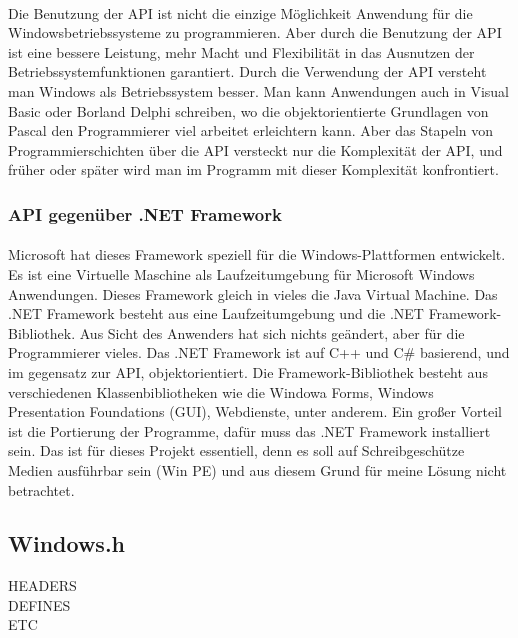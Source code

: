 \paragraph{}
Die Benutzung der API ist nicht die einzige Möglichkeit Anwendung für die Windowsbetriebssysteme zu programmieren. Aber durch die Benutzung der API ist eine bessere Leistung, mehr Macht und Flexibilität in das Ausnutzen der Betriebssystemfunktionen garantiert. Durch die Verwendung der API versteht man Windows als Betriebssystem besser. Man kann Anwendungen auch in Visual Basic oder Borland Delphi schreiben, wo die objektorientierte Grundlagen von Pascal den Programmierer viel arbeitet erleichtern kann. Aber das Stapeln von Programmierschichten über die API versteckt nur die Komplexität der API, und früher oder später wird man im Programm mit dieser Komplexität konfrontiert.

\subsubsection{API gegenüber .NET Framework}
\paragraph{}
Microsoft hat dieses Framework speziell für die Windows-Plattformen entwickelt. Es ist eine Virtuelle Maschine als Laufzeitumgebung für Microsoft Windows Anwendungen. Dieses Framework gleich in vieles die Java Virtual Machine. Das .NET Framework besteht aus eine Laufzeitumgebung und die .NET Framework-Bibliothek. Aus Sicht des Anwenders hat sich nichts geändert, aber für die Programmierer vieles. Das .NET Framework ist auf C++ und C\# basierend, und im gegensatz zur API, objektorientiert. Die Framework-Bibliothek besteht aus verschiedenen Klassenbibliotheken wie die Windowa Forms, Windows Presentation Foundations (GUI), Webdienste, unter anderem. Ein großer Vorteil ist die Portierung der Programme, dafür muss das .NET Framework installiert sein. Das ist für dieses Projekt essentiell, denn es soll auf Schreibgeschütze Medien ausführbar sein (Win PE) und aus diesem Grund für meine Lösung nicht betrachtet.





\subsection{Windows.h}

HEADERS
\\
DEFINES
\\ETC





